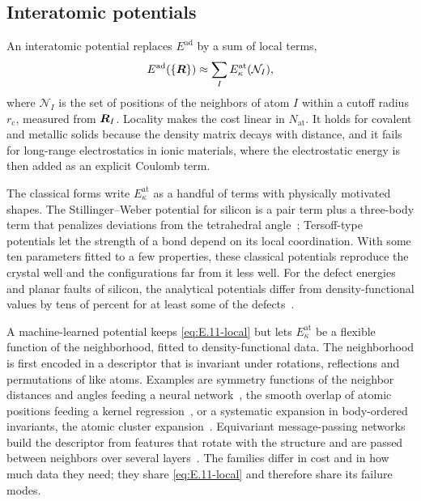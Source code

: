 \subsection{Interatomic potentials}

An interatomic potential replaces $E^{\mathrm{ad}}$ by a sum of local terms,
\begin{equation}
  E^{\mathrm{ad}}(\{\bm{R}\}) \approx \sum_I E^{\mathrm{at}}_\kappa(\mathcal{N}_I),
  \label{eq:E.11-local}
\end{equation}
where $\mathcal{N}_I$ is the set of positions of the neighbors of atom $I$ within a cutoff radius $r_{\mathrm{c}}$, measured from $\bm{R}_I$. Locality makes the cost linear in $N_{\mathrm{at}}$. It holds for covalent and metallic solids because the density matrix decays with distance, and it fails for long-range electrostatics in ionic materials, where the electrostatic energy is then added as an explicit Coulomb term.

The classical forms write $E^{\mathrm{at}}_\kappa$ as a handful of terms with physically motivated shapes. The Stillinger--Weber potential for silicon is a pair term plus a three-body term that penalizes deviations from the tetrahedral angle~\cite{stillinger1985computer}; Tersoff-type potentials let the strength of a bond depend on its local coordination. With some ten parameters fitted to a few properties, these classical potentials reproduce the crystal well and the configurations far from it less well. For the defect energies and planar faults of silicon, the analytical potentials differ from density-functional values by tens of percent for at least some of the defects~\cite[Sect.~III\,E]{bartok2018machine}.

A machine-learned potential keeps \cref{eq:E.11-local} but lets $E^{\mathrm{at}}_\kappa$ be a flexible function of the neighborhood, fitted to density-functional data. The neighborhood is first encoded in a descriptor that is invariant under rotations, reflections and permutations of like atoms. Examples are symmetry functions of the neighbor distances and angles feeding a neural network~\cite{behler2007generalized}, the smooth overlap of atomic positions feeding a kernel regression~\cite{bartok2010gaussian}, or a systematic expansion in body-ordered invariants, the atomic cluster expansion~\cite{drautz2019atomic}. Equivariant message-passing networks build the descriptor from features that rotate with the structure and are passed between neighbors over several layers~\cite{batzner2022e3,batatia2022mace}. The families differ in cost and in how much data they need; they share \cref{eq:E.11-local} and therefore share its failure modes.

